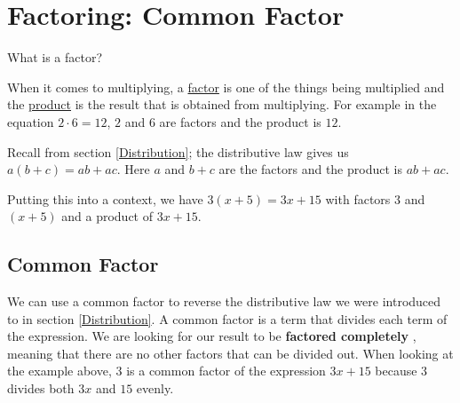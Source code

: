 %
%

\section{Factoring: Common Factor}
\label{CommonFactor}

What is a factor?

When it comes to multiplying, a \underline{factor}  is one of the things being multiplied and the \underline{product} is the result that is obtained from multiplying.  For example in the equation $2 \cdot 6 = 12$, $2$ and $6$ are factors and the product is $12$.

Recall from section \ref{Distribution}; the distributive law gives us $a(b+c)=ab+ac$.  Here $a$ and $b+c$ are the factors and the product is $ab+ac$.

Putting this into a context, we have $3(x+5)=3x+15$ with factors $3$ and $(x+5)$ and a product of $3x+15$.

%
%

\subsection{Common Factor}

We can use a common factor to reverse the distributive law we were introduced to in section \ref{Distribution}.  A common factor is a term that divides each term of the expression. We are looking for our result to be \textbf{factored completely} , meaning that there are no other factors that can be divided out. When looking at the example above, $3$ is a common factor of the expression $3x+15$ because $3$ divides both $3x$ and $15$ evenly.



